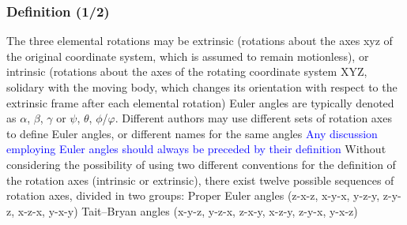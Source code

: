 \begin{frame}
  \frametitle{Definition \hfill(1/2)}
  \begin{outline}
    \1 The three elemental rotations may be extrinsic (rotations about the axes xyz of the original coordinate system, which is assumed to remain motionless), or intrinsic 
(rotations about the axes of the rotating coordinate system XYZ, solidary with the moving body, which changes its orientation with respect to the extrinsic frame after each 
elemental rotation)
    \1 Euler angles are typically denoted as $\alpha$, $\beta$, $\gamma$ or $\psi$, $\theta$, $\phi$/$\varphi$. Different authors may use different sets of rotation axes to define
      Euler angles, or different names for the same angles
    \1 \textcolor{blue}{Any discussion employing Euler angles should always be preceded by their definition}
    \1 Without considering the possibility of using two different conventions for the definition of the rotation axes (intrinsic or extrinsic), there exist twelve possible 
sequences of rotation axes, divided in two groups:
    \2 Proper Euler angles (z-x-z, x-y-x, y-z-y, z-y-z, x-z-x, y-x-y)
    \2 Tait–Bryan angles (x-y-z, y-z-x, z-x-y, x-z-y, z-y-x, y-x-z)
  \end{outline}
\end{frame}
